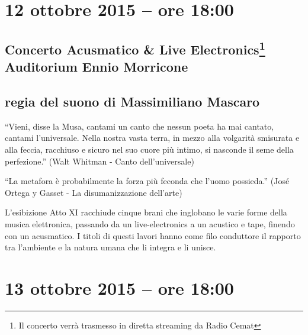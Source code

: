 \documentclass[8pt, twoside, a5paper]{extreport}
\begin{document}
\clearpage

\section*{12 ottobre 2015 -- ore 18:00}

\subsection*{{\small Concerto Acusmatico \& Live Electronics\footnote{ Il concerto verrà trasmesso in diretta streaming da Radio Cemat}} \\
	\textsf{Auditorium Ennio Morricone}}

{\fontsize{30}{30} }

\subsection*{\textsf{regia del suono di Massimiliano Mascaro}}

“Vieni, disse la Musa,
cantami un canto che nessun poeta ha mai cantato,
cantami l'universale.
Nella nostra vasta terra,
in mezzo alla volgarità smisurata e alla feccia,
racchiuso e sicuro nel suo cuore più intimo,
si nasconde il seme della perfezione.”
(Walt Whitman - Canto dell'universale)

“La metafora è probabilmente la forza più feconda che l'uomo possieda.”
(Jos\'e Ortega y  Gasset - La disumanizzazione dell'arte)

L'esibizione Atto XI racchiude cinque brani che inglobano le varie forme della musica elettronica, passando da un live-electronics a un acustico e tape, finendo con un acusmatico. I titoli di questi lavori hanno come filo conduttore il rapporto tra l'ambiente e la natura umana che li integra e li unisce.


\begin{multicols}{2}




\end{multicols}

\clearpage

\section*{13 ottobre 2015 -- ore 18:00}
\end{document}
